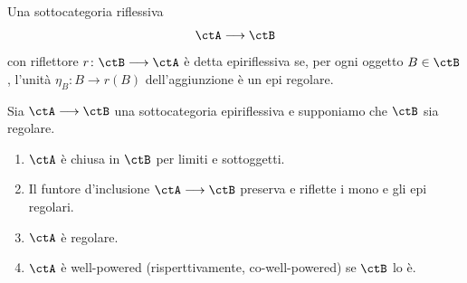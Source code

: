 \begin{definition}\label{def_sottocat_epirifl}
 Una sottocategoria riflessiva
 \[\ctA \fun \ctB\]
 con riflettore \(r \colon \ctB \fun \ctA\) è detta epiriflessiva se, per ogni oggetto \(B \in \ctB\), l'unità \(\eta_B \colon B \to r(B)\)
 dell'aggiunzione è un epi regolare.
\end{definition}

\begin{lemma}\label{lemma_epirifl_reg}
 Sia \(\ctA \fun \ctB\) una sottocategoria epiriflessiva e supponiamo che \(\ctB\) sia regolare.
 \begin{enumerate}
  \item \(\ctA\) è chiusa in \(\ctB\) per limiti e sottoggetti.
  \item Il funtore d'inclusione \(\ctA \fun \ctB\) preserva e riflette i mono e gli epi regolari.
  \item \(\ctA\) è regolare.
  \item \(\ctA\) è well-powered (risperttivamente, co-well-powered) se \(\ctB\) lo è.
 \end{enumerate}
\end{lemma}

